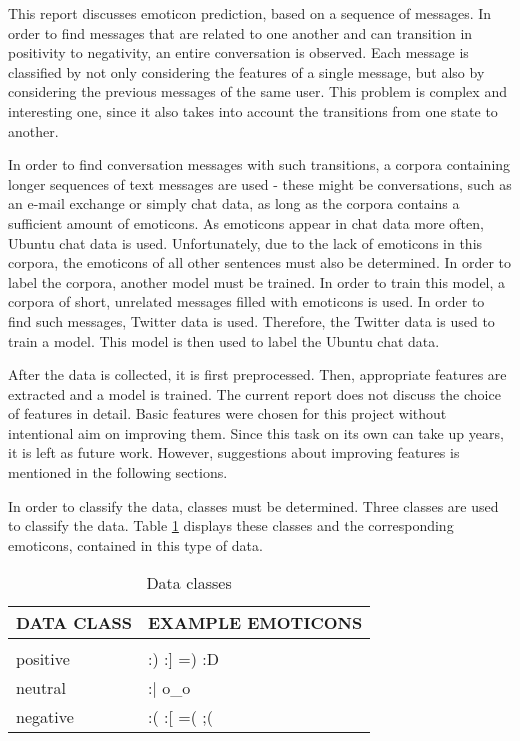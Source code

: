 This report discusses emoticon prediction, based on a sequence of messages. In order to find messages that are related to one another and can transition in positivity to negativity, an entire conversation is observed. Each message is classified by not only considering the features of a single message, but also by considering the previous messages of the same user. This problem is complex and interesting one, since it also takes into account the transitions from one state to another.

\noindent In order to find conversation messages with such transitions, a corpora containing longer sequences of text messages are used - these might be conversations, such as an e-mail exchange or simply chat data, as long as the corpora contains a sufficient amount of emoticons. As emoticons appear in chat data more often, Ubuntu chat data is used. Unfortunately, due to the lack of emoticons in this corpora, the emoticons of all other sentences must also be determined. In order to label the corpora, another model must be trained. In order to train this model, a corpora of short, unrelated messages filled with emoticons is used. In order to find such messages, Twitter data is used. Therefore, the Twitter data is used to train a model. This model is then used to label the Ubuntu chat data. 

\noindent After the data is collected, it is first preprocessed. Then, appropriate features are extracted and a model is trained. The current report does not discuss the choice of features in detail. Basic features were chosen for this project without intentional aim on improving them. Since this task on its own can take up years, it is left as future work. However, suggestions about improving features is mentioned in the following sections.

\noindent In order to classify the data, classes must be determined. Three classes are used to classify the data. Table \ref{tab:classes} displays these classes and the corresponding emoticons, contained in this type of data.

\begin{table}[h!]
\caption{Data classes}
\label{tab:classes}
\begin{center}
\begin{tabular}{ll}
\multicolumn{1}{l}{\bf DATA CLASS}  &\multicolumn{1}{l}{\bf EXAMPLE EMOTICONS}
\\ \hline \\
positive 			& :) \: \:  			:] \: \: 		=) \: \: 		:D  	\\
neutral 				& :$\vert$ \: \: 	o\_o  								\\
negative 			& :( \: \: 			:[ \: \: 		=( \: \: 		;( 		\\
\end{tabular}{}
\end{center}
\end{table}

